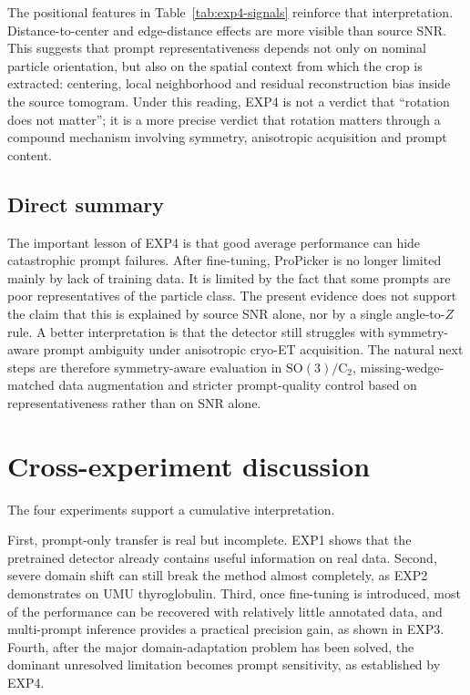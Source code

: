 \documentclass[12pt,a4paper]{report}
\begin{document}
The positional features in Table~\ref{tab:exp4-signals} reinforce that interpretation. Distance-to-center and edge-distance effects are more visible than source SNR. This suggests that prompt representativeness depends not only on nominal particle orientation, but also on the spatial context from which the crop is extracted: centering, local neighborhood and residual reconstruction bias inside the source tomogram. Under this reading, EXP4 is not a verdict that \enquote{rotation does not matter}; it is a more precise verdict that rotation matters through a compound mechanism involving symmetry, anisotropic acquisition and prompt content.

\subsection{Direct summary}
The important lesson of EXP4 is that good average performance can hide catastrophic prompt failures. After fine-tuning, ProPicker is no longer limited mainly by lack of training data. It is limited by the fact that some prompts are poor representatives of the particle class. The present evidence does not support the claim that this is explained by source SNR alone, nor by a single angle-to-\(Z\) rule. A better interpretation is that the detector still struggles with symmetry-aware prompt ambiguity under anisotropic cryo-ET acquisition. The natural next steps are therefore symmetry-aware evaluation in \(\mathrm{SO}(3)/\mathrm{C}_2\), missing-wedge-matched data augmentation and stricter prompt-quality control based on representativeness rather than on SNR alone.

\section{Cross-experiment discussion}
The four experiments support a cumulative interpretation.

First, prompt-only transfer is real but incomplete. EXP1 shows that the pretrained detector already contains useful information on real data. Second, severe domain shift can still break the method almost completely, as EXP2 demonstrates on UMU thyroglobulin. Third, once fine-tuning is introduced, most of the performance can be recovered with relatively little annotated data, and multi-prompt inference provides a practical precision gain, as shown in EXP3. Fourth, after the major domain-adaptation problem has been solved, the dominant unresolved limitation becomes prompt sensitivity, as established by EXP4.
\end{document}

